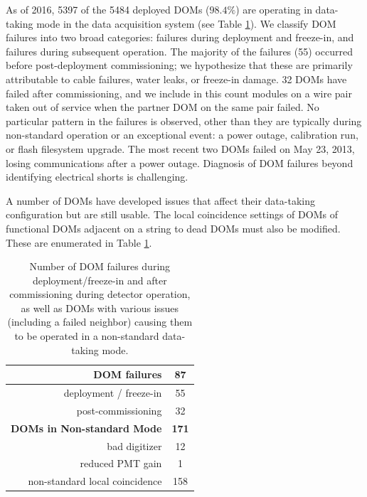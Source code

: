 As of 2016, 5397 of the 5484 deployed DOMs ($98.4\%$) are operating in
data-taking mode in the data acquisition system (see Table
\ref{tab:dom_failures}).  We classify DOM 
failures into two broad categories: failures during deployment and
freeze-in, and failures during subsequent operation.  The majority of the
failures (55) occurred before post-deployment commissioning; we hypothesize
that these are primarily attributable to cable failures, water leaks,
or freeze-in damage. 32 DOMs have failed after commissioning, and
we include in this count modules on a wire pair taken out of service when
the partner DOM on the same pair failed.  No particular pattern in the
failures is observed, other than they are typically during non-standard
operation or an exceptional event: a power outage, calibration run, or
flash filesystem upgrade.  The most recent two DOMs failed on May 23, 2013,
losing communications after a power outage.  Diagnosis of DOM failures
beyond identifying electrical shorts is challenging.

A number of DOMs have developed issues that affect their data-taking
configuration but are still usable.  The local coincidence settings of DOMs of
functional DOMs adjacent on a string to dead DOMs must also be
modified. These are enumerated in Table \ref{tab:dom_failures}.  

\begin{table}[h]
  \centering
  \begin{tabular}{| r | c |}
    \hline
    \bf{DOM failures} & \bf{87} \\
    \hline    
    deployment / freeze-in & 55 \\
    post-commissioning & 32 \\
    \hline
    \hline
    \bf{DOMs in Non-standard Mode} & \bf{171} \\
    \hline
    bad digitizer & 12 \\
    reduced PMT gain & 1 \\
    non-standard local coincidence & 158 \\
    \hline    
  \end{tabular}
  \caption{Number of DOM failures during deployment/freeze-in and after
    commissioning during detector operation, as well as DOMs with various
    issues (including a failed neighbor) causing them to be operated in a
    non-standard data-taking mode.} 
  \label{tab:dom_failures}
\end{table}

